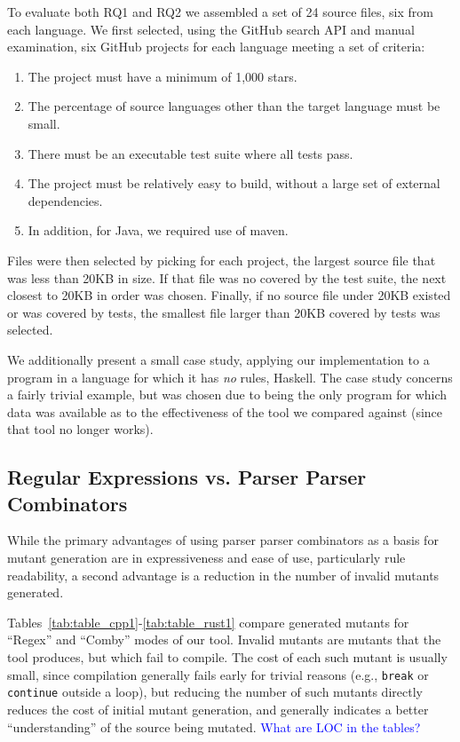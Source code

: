 \documentclass[sigconf,review, anonymous]{acmart}
\newcommand{\clg}[1]{\textcolor{blue}{#1}}
\begin{document}
{To evaluate both RQ1 and RQ2 we assembled a set of 24 source files,
six from each language.  We first selected, using the GitHub search
API and manual examination, six GitHub
projects for each language meeting a set of criteria:

\begin{enumerate}
\item The project must have a minimum of 1,000 stars.
  \item The percentage of source languages other than the target
    language must be small.
  \item There must be an executable test suite where all tests pass.
    \item The project must be relatively easy to build, without a
      large set of external dependencies.
      \item In addition, for Java, we required use of maven.
      \end{enumerate}

      Files were then selected by picking for each project, the
      largest source file that was less than 20KB in size.  If that
      file was no covered by the test suite, the next closest to 20KB in order
      was chosen.  Finally, if no source file under 20KB existed or
      was covered by tests, the smallest file larger than 20KB covered
      by tests was selected.


We additionally present a small
case study, applying our implementation to a program in a language for
which it has \emph{no} rules, Haskell.  The case study concerns a
fairly trivial example, but was chosen due to being the only program
for which data was available as to the effectiveness of the tool we
compared against (since that tool no longer works).

\subsection{Regular Expressions vs. Parser Parser Combinators}

While the primary advantages of using parser parser combinators as a
basis for mutant generation are in expressiveness and ease of use,
particularly rule readability, a second advantage is a reduction in
the number of invalid mutants generated.

Tables~\ref{tab:table_cpp1}-\ref{tab:table_rust1} compare generated
mutants for ``Regex'' and ``Comby'' modes of our tool.  Invalid
mutants are mutants that the tool produces, but which fail to
compile.  The cost of each such mutant is usually small,
since compilation generally fails early for trivial reasons (e.g.,
{\tt break} or {\tt continue} outside a loop), 
but reducing the number of such mutants directly reduces the cost of
initial mutant generation, and generally indicates a better
``understanding'' of the source being mutated.
\clg{What are LOC in the tables?}

}
\end{document}
